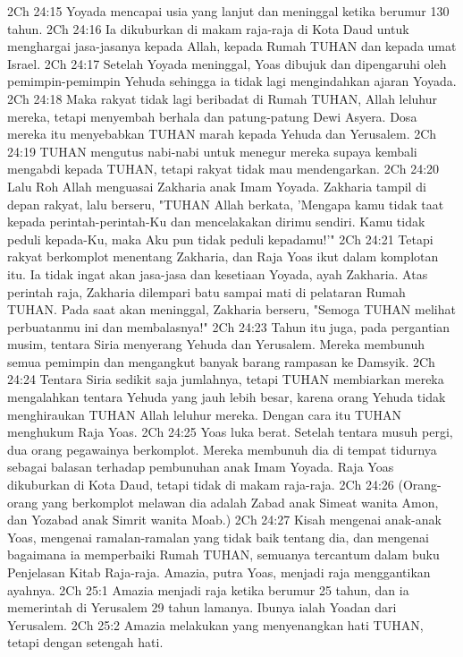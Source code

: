 2Ch 24:15  Yoyada mencapai usia yang lanjut dan meninggal ketika berumur 130 tahun.
2Ch 24:16  Ia dikuburkan di makam raja-raja di Kota Daud untuk menghargai jasa-jasanya kepada Allah, kepada Rumah TUHAN dan kepada umat Israel.
2Ch 24:17  Setelah Yoyada meninggal, Yoas dibujuk dan dipengaruhi oleh pemimpin-pemimpin Yehuda sehingga ia tidak lagi mengindahkan ajaran Yoyada.
2Ch 24:18  Maka rakyat tidak lagi beribadat di Rumah TUHAN, Allah leluhur mereka, tetapi menyembah berhala dan patung-patung Dewi Asyera. Dosa mereka itu menyebabkan TUHAN marah kepada Yehuda dan Yerusalem.
2Ch 24:19  TUHAN mengutus nabi-nabi untuk menegur mereka supaya kembali mengabdi kepada TUHAN, tetapi rakyat tidak mau mendengarkan.
2Ch 24:20  Lalu Roh Allah menguasai Zakharia anak Imam Yoyada. Zakharia tampil di depan rakyat, lalu berseru, "TUHAN Allah berkata, 'Mengapa kamu tidak taat kepada perintah-perintah-Ku dan mencelakakan dirimu sendiri. Kamu tidak peduli kepada-Ku, maka Aku pun tidak peduli kepadamu!'"
2Ch 24:21  Tetapi rakyat berkomplot menentang Zakharia, dan Raja Yoas ikut dalam komplotan itu. Ia tidak ingat akan jasa-jasa dan kesetiaan Yoyada, ayah Zakharia. Atas perintah raja, Zakharia dilempari batu sampai mati di pelataran Rumah TUHAN. Pada saat akan meninggal, Zakharia berseru, "Semoga TUHAN melihat perbuatanmu ini dan membalasnya!"
2Ch 24:23  Tahun itu juga, pada pergantian musim, tentara Siria menyerang Yehuda dan Yerusalem. Mereka membunuh semua pemimpin dan mengangkut banyak barang rampasan ke Damsyik.
2Ch 24:24  Tentara Siria sedikit saja jumlahnya, tetapi TUHAN membiarkan mereka mengalahkan tentara Yehuda yang jauh lebih besar, karena orang Yehuda tidak menghiraukan TUHAN Allah leluhur mereka. Dengan cara itu TUHAN menghukum Raja Yoas.
2Ch 24:25  Yoas luka berat. Setelah tentara musuh pergi, dua orang pegawainya berkomplot. Mereka membunuh dia di tempat tidurnya sebagai balasan terhadap pembunuhan anak Imam Yoyada. Raja Yoas dikuburkan di Kota Daud, tetapi tidak di makam raja-raja.
2Ch 24:26  (Orang-orang yang berkomplot melawan dia adalah Zabad anak Simeat wanita Amon, dan Yozabad anak Simrit wanita Moab.)
2Ch 24:27  Kisah mengenai anak-anak Yoas, mengenai ramalan-ramalan yang tidak baik tentang dia, dan mengenai bagaimana ia memperbaiki Rumah TUHAN, semuanya tercantum dalam buku Penjelasan Kitab Raja-raja. Amazia, putra Yoas, menjadi raja menggantikan ayahnya.
2Ch 25:1  Amazia menjadi raja ketika berumur 25 tahun, dan ia memerintah di Yerusalem 29 tahun lamanya. Ibunya ialah Yoadan dari Yerusalem.
2Ch 25:2  Amazia melakukan yang menyenangkan hati TUHAN, tetapi dengan setengah hati.
